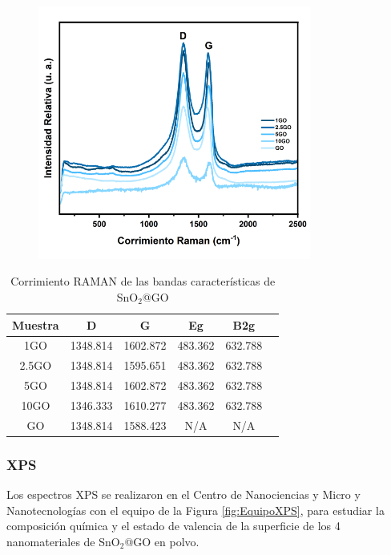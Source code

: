 \documentclass[12pt]{article}
\begin{document}
\begin{figure}[H]
    	   \begin{center}
     	  	\includegraphics[width = 0.8\textwidth]{Imagenes/SnO2GO_RAMAN.png}
    	   \end{center} 
        \end{figure}
\begin{table}[ht]
    \centering
    \caption{Corrimiento RAMAN de las bandas características de SnO$\displaystyle _{2}$@GO}
    \begin{tabular}{|c|c|c|c|c|c|}
        \toprule
        \hline
        Muestra & D & G & Eg & B2g \\
        \midrule
        \hline
        1GO & 1348.814 & 1602.872 & 483.362 & 632.788 \\ \hline
        2.5GO & 1348.814 & 1595.651 & 483.362 & 632.788 \\\hline
        5GO & 1348.814 & 1602.872 & 483.362 & 632.788 \\\hline
        10GO & 1346.333 & 1610.277 & 483.362 & 632.788 \\\hline
        GO & 1348.814 & 1588.423 & N/A & N/A \\\hline
        \bottomrule
    \end{tabular}
    \label{tab:Raman_SnOGO}
\end{table}

\subsubsection{XPS}
Los espectros XPS se realizaron en el Centro de Nanociencias y Micro y Nanotecnologías con el equipo de la Figura \ref{fig:EquipoXPS}, para estudiar la composición química y el estado de valencia de la superficie de los 4 nanomateriales de SnO$\displaystyle _{2}$@GO en polvo.\vspace{1em} %
\end{document}
